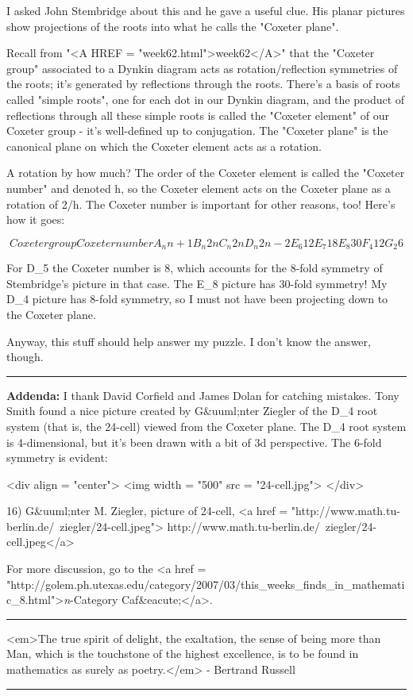I asked John Stembridge about this and he gave a useful clue.  His
planar pictures show projections of the roots into what he calls the 
"Coxeter plane".  

Recall from "<A HREF = "week62.html">week62</A>" that the "Coxeter group" associated to a Dynkin 
diagram acts as rotation/reflection symmetries of the roots; it's 
generated by reflections through the roots.  There's a basis of roots 
called "simple roots", one for each dot in our Dynkin diagram, and 
the product of reflections through all these simple roots is called 
the "Coxeter element" of our Coxeter group - it's well-defined up to 
conjugation.  The "Coxeter plane" is the canonical plane on which the
Coxeter element acts as a rotation.

A rotation by how much?  The order of the Coxeter element is called
the "Coxeter number" and denoted h, so the Coxeter element
acts on the Coxeter plane as a rotation of 2\pi /h.  The Coxeter number
is important for other reasons, too!  Here's how it goes:


$$

Coxeter group   Coxeter number
   A_{n}               n+1
   B_{n}               2n
   C_{n}               2n
   D_{n}               2n-2
   E_{6}               12
   E_{7}               18 
   E_{8}               30
   F_{4}               12
   G_{2}               6
$$
    
For D_{5} the Coxeter number is 8, which accounts for the
8-fold symmetry of Stembridge's picture in that case.  The
E_{8} picture has 30-fold symmetry!  My D_{4} picture
has 8-fold symmetry, so I must not have been projecting down to the
Coxeter plane.

Anyway, this stuff should help answer my puzzle.  I don't know the answer,
though.


\par\noindent\rule{\textwidth}{0.4pt}
\textbf{Addenda:} I thank David Corfield and James Dolan for catching
mistakes.  Tony Smith found a nice picture created by G&uuml;nter
Ziegler of the D_{4} root system (that is, the 24-cell) 
viewed from the Coxeter plane.  The D_{4} root system is
4-dimensional, but it's been drawn with a bit of 3d perspective.  
The 6-fold symmetry is evident:

<div align = "center">
<img width = "500" src = "24-cell.jpg">
</div>

16) G&uuml;nter M. Ziegler, picture of 24-cell,
<a href = "http://www.math.tu-berlin.de/~ziegler/24-cell.jpeg">
http://www.math.tu-berlin.de/~ziegler/24-cell.jpeg</a>

For more discussion, go to the <a href = "http://golem.ph.utexas.edu/category/2007/03/this_weeks_finds_in_mathematic_8.html">\emph{n}-Category 
Caf&eacute;</a>.

\par\noindent\rule{\textwidth}{0.4pt}
<em>The true spirit of delight, the exaltation, the sense of being more 
than Man, which is the touchstone of the highest excellence, is to 
be found in mathematics as surely as poetry.</em> - Bertrand Russell

\par\noindent\rule{\textwidth}{0.4pt}

